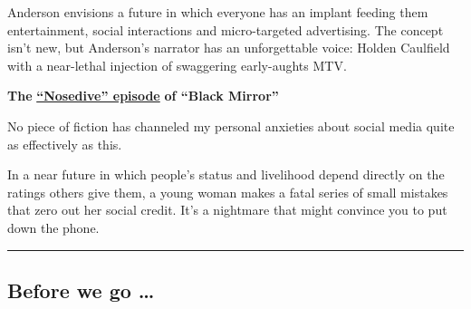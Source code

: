 Anderson envisions a future in which everyone has an implant feeding
them entertainment, social interactions and micro-targeted advertising.
The concept isn't new, but Anderson's narrator has an unforgettable
voice: Holden Caulfield with a near-lethal injection of swaggering
early-aughts MTV.

\textbf{The}
\textbf{\href{https://www.nytimes3xbfgragh.onion/2016/10/21/arts/television/review-black-mirror-finds-terror-and-soul-in-the-machine.html}{``Nosedive''
episode}} \textbf{of ``Black Mirror''}

No piece of fiction has channeled my personal anxieties about social
media quite as effectively as this.

In a near future in which people's status and livelihood depend directly
on the ratings others give them, a young woman makes a fatal series of
small mistakes that zero out her social credit. It's a nightmare that
might convince you to put down the phone.

\begin{center}\rule{0.5\linewidth}{\linethickness}\end{center}

\hypertarget{before-we-go-}{%
\subsection{Before we go \ldots{}}\label{before-we-go-}}

